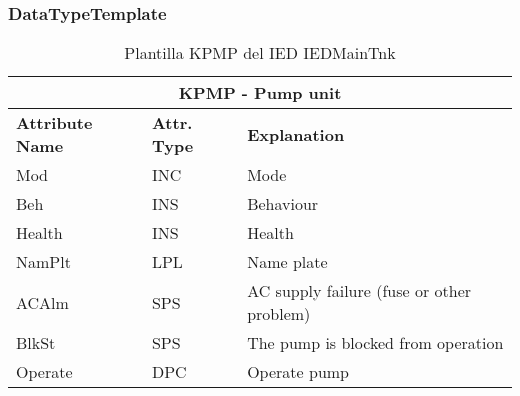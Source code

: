     \subsubsection{DataTypeTemplate}
    \begin{table}[H]
    \begin{center}
    \begin{tabular}{|l|l|p{8.5cm}|}
            \hline
            \multicolumn{3}{|c|}{\cellcolor[gray]{0.8} \textbf{ KPMP}  - Pump unit} \\
            \hline
            \textbf{Attribute Name} & \textbf{Attr. Type} & \textbf{Explanation} \\
            \hline 
            Mod & INC & Mode \\
            \hline
            Beh & INS & Behaviour \\
            \hline
            Health & INS & Health \\
            \hline
            NamPlt & LPL & Name plate \\
            \hline
            ACAlm & SPS & AC supply failure (fuse or other problem) \\
            \hline
            BlkSt & SPS & The pump is blocked from operation \\
            \hline
            Operate & DPC & Operate pump \\
            \hline
    \end{tabular}
    \caption{Plantilla KPMP del IED IEDMainTnk}
    \label{table:lnTypeKPMPa}
    \end{center}
    \end{table}
    
    
    